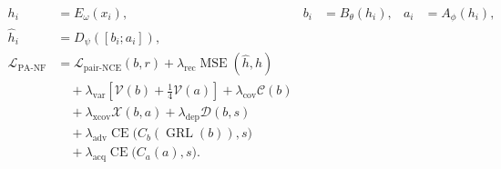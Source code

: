\begin{equation}
\begin{aligned}
h_i &= E_{\omega}(x_i), &
b_i &= B_{\theta}(h_i), &
a_i &= A_{\phi}(h_i),\\
\widehat h_i &= D_{\psi}([b_i;a_i]),\\[2pt]
\mathcal{L}_{\mathrm{PA\text{-}NF}}
&= \mathcal{L}_{\mathrm{pair\text{-}NCE}}(b,r)
   +\lambda_{\mathrm{rec}}\operatorname{MSE}(\widehat h,h)\\
&\quad +\lambda_{\mathrm{var}}\!
  \left[\mathcal{V}(b)+\tfrac14\mathcal{V}(a)\right]
   +\lambda_{\mathrm{cov}}\mathcal{C}(b)\\
&\quad +\lambda_{\mathrm{xcov}}\mathcal{X}(b,a)
   +\lambda_{\mathrm{dep}}\mathcal{D}(b,s)\\
&\quad +\lambda_{\mathrm{adv}}\operatorname{CE}
   \bigl(C_b(\operatorname{GRL}(b)),s\bigr)\\
&\quad +\lambda_{\mathrm{acq}}\operatorname{CE}
   \bigl(C_a(a),s\bigr).
\end{aligned}
\label{eq:panf}
\end{equation}
